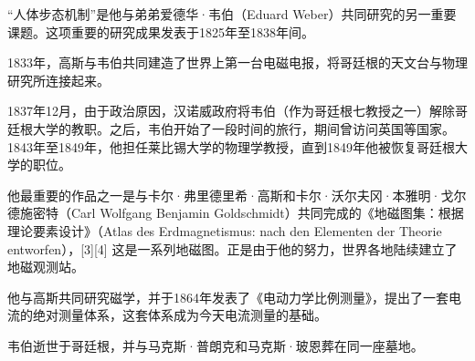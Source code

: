 “人体步态机制”是他与弟弟爱德华·韦伯（Eduard Weber）共同研究的另一重要课题。这项重要的研究成果发表于1825年至1838年间。  

1833年，高斯与韦伯共同建造了世界上第一台电磁电报，将哥廷根的天文台与物理研究所连接起来。

1837年12月，由于政治原因，汉诺威政府将韦伯（作为哥廷根七教授之一）解除哥廷根大学的教职。之后，韦伯开始了一段时间的旅行，期间曾访问英国等国家。1843年至1849年，他担任莱比锡大学的物理学教授，直到1849年他被恢复哥廷根大学的职位。  

他最重要的作品之一是与卡尔·弗里德里希·高斯和卡尔·沃尔夫冈·本雅明·戈尔德施密特（Carl Wolfgang Benjamin Goldschmidt）共同完成的《地磁图集：根据理论要素设计》（Atlas des Erdmagnetismus: nach den Elementen der Theorie entworfen），[3][4] 这是一系列地磁图。正是由于他的努力，世界各地陆续建立了地磁观测站。  

他与高斯共同研究磁学，并于1864年发表了《电动力学比例测量》，提出了一套电流的绝对测量体系，这套体系成为今天电流测量的基础。  

韦伯逝世于哥廷根，并与马克斯·普朗克和马克斯·玻恩葬在同一座墓地。